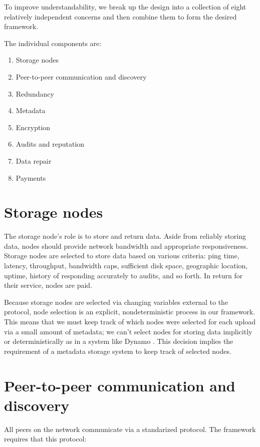 \documentclass[11pt,fleqn,openany]{book}
\begin{document}
To improve understandability, we break up the design into a collection of eight
relatively independent concerns and then combine them to form the desired
framework.

The individual components are:

\begin{enumerate}
\item Storage nodes
\item Peer-to-peer communication and discovery
\item Redundancy
\item Metadata
\item Encryption
\item Audits and reputation
\item Data repair
\item Payments
\end{enumerate}

\section{Storage nodes}

The storage node's role is to store and return data.
Aside from reliably storing data, nodes should provide
network bandwidth and appropriate responsiveness.
Storage nodes are selected to store data based on various criteria: ping time,
latency, throughput, bandwidth caps, sufficient disk space,
geographic location, uptime, history of responding accurately to audits, and
so forth. In return for their service, nodes are paid.

Because storage
nodes are selected via changing variables external to the protocol, node
selection is an explicit, nondeterministic process in our framework. This means
that we must keep track of which nodes were selected for each upload via a
small amount of metadata; we can't select nodes for storing data implicitly or
deterministically as in a system like Dynamo \cite{dynamo}. This decision
implies the requirement of a metadata storage system to keep track
of selected nodes.

\section{Peer-to-peer communication and discovery}

All peers on the network communicate via a standarized protocol. The
framework requires that this protocol:
\end{document}
